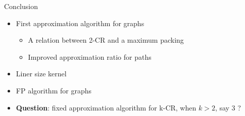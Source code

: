 \begin{frame}{Conclusion}
\begin{itemize}
	

\item
First approximation algorithm for graphs

\begin{itemize}
\pause\item
A relation between 2-CR and a maximum packing 

\pause\item
Improved approximation ratio for paths 
\end{itemize}

\pause\item
Liner size kernel

\pause\item
FP algorithm for graphs

\pause\item
\textbf{Question}: fixed approximation algorithm for k-CR, when $k > 2$, say 3 ?
	
\end{itemize}
\end{frame}